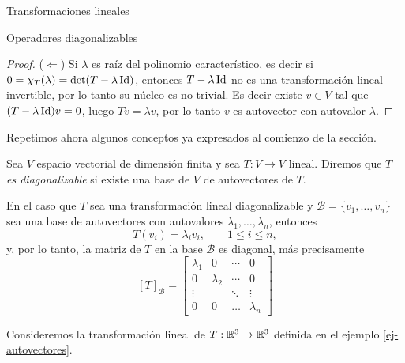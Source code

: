 \begin{chapter}{Transformaciones lineales}
\begin{section}{Operadores diagonalizables}
\begin{proof}
            ($\Leftarrow$) Si $\lambda$ es raíz del polinomio característico, es decir si $0 = \chi_T(\lambda) = \det(T-\lambda \operatorname{Id})$, entonces $T-\lambda \operatorname{Id}$ no es una transformación lineal  invertible, por lo tanto  su núcleo es no trivial. Es decir existe $v \in V$ tal que $(T-\lambda \operatorname{Id})v =0$, luego $Tv =\lambda v$, por lo tanto $v$ es autovector con autovalor $\lambda$.   
        \end{proof}
        
        Repetimos ahora algunos conceptos ya expresados al comienzo de la sección. 
        
        \begin{definicion}
            Sea $V$ espacio vectorial de dimensión finita y sea $T: V \to V$ lineal. Diremos que \textit{$T$ es diagonalizable} si existe una base de $V$ de autovectores de $T$. 
        \end{definicion}	
        
        En el caso que $T$ sea una transformación lineal diagonalizable y $\mathcal{B} = \{v_1,\ldots,v_n \}$ sea una base de autovectores con autovalores $\lambda_1,\ldots,\lambda_n$, entonces
        $$
        T(v_i) = \lambda_i v_i, \qquad 1 \le i \le n,
        $$ 
        y, por lo tanto, la matriz de $T$ en  la base $\mathcal{B}$ es diagonal, más precisamente
        $$
        [T]_\mathcal{B} = \begin{bmatrix}
        \lambda_1 &0 & \cdots & 0 \\
        0 & \lambda_2 & \cdots &0 \\
        \vdots & &\ddots & \vdots \\
        0 & 0 & \ldots &\lambda_n
        \end{bmatrix}
        $$
        
        \begin{ejemplo*} Consideremos la transformación lineal de $T:\mathbb R^3\to\mathbb R^3$  definida en el ejemplo \ref{ej-autovectores}.


\end{ejemplo*}
\end{section}
\end{chapter}
